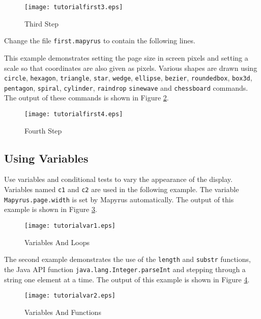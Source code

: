 \begin{figure}[htb]
\texttt{[image: tutorialfirst3.eps]}
\caption{Third Step}
\label{tutorialfirst3}
\end{figure}

Change the file \texttt{first.mapyrus} to contain the following lines.



This example demonstrates setting the page size in
screen pixels and setting a scale so that coordinates
are also given as pixels.
Various shapes
are drawn using \texttt{circle},
\texttt{hexagon}, \texttt{triangle}, \texttt{star},
\texttt{wedge}, \texttt{ellipse}, \texttt{bezier},
\texttt{roundedbox}, \texttt{box3d},
\texttt{pentagon}, \texttt{spiral},
\texttt{cylinder}, \texttt{raindrop}
\texttt{sinewave} and \texttt{chessboard}
commands.
The output of these commands is shown in Figure \ref{tutorialfirst4}.

\begin{figure}[htb]
\texttt{[image: tutorialfirst4.eps]}
\caption{Fourth Step}
\label{tutorialfirst4}
\end{figure}

\subsection{Using Variables}

Use variables and conditional tests to vary the appearance
of the display.
Variables named \texttt{c1} and \texttt{c2} are used in the
following example.  The variable
\texttt{Mapyrus.page.width}
is set by Mapyrus automatically.
The output of this example is shown in Figure \ref{tutorialvar1}.



\begin{figure}[htb]
\texttt{[image: tutorialvar1.eps]}
\caption{Variables And Loops}
\label{tutorialvar1}
\end{figure}

The second example demonstrates the use of the
\texttt{length} and \texttt{substr}
functions,
the Java API function
\texttt{java.lang.Integer.parseInt}
and stepping through a string one element at a time.
The output of this example is shown in Figure \ref{tutorialvar2}.



\begin{figure}[htb]
\texttt{[image: tutorialvar2.eps]}
\caption{Variables And Functions}
\label{tutorialvar2}
\end{figure}


